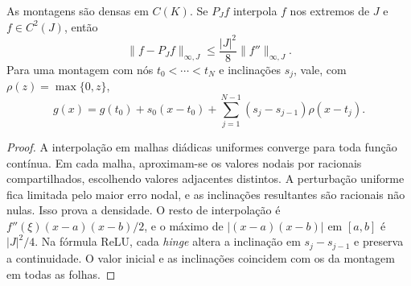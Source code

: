 \begin{proposition}\label{map:artigo_2:2.3}\label{artigo_2:prop:preliminary-facts}
As montagens são densas em $C(K)$. Se $P_Jf$ interpola $f$ nos extremos de $J$ e $f\in C^2(J)$, então
\begin{equation}
 \|f-P_Jf\|_{\infty,J}\le\frac{|J|^2}{8}\|f''\|_{\infty,J}.
 \label{artigo_2:eq:interpolation-remainder}
\end{equation}
Para uma montagem com nós $t_0<\cdots<t_N$ e inclinações $s_j$, vale, com $\rho(z)=\max\{0,z\}$,
\begin{equation}
 g(x)=g(t_0)+s_0(x-t_0)+\sum_{j=1}^{N-1}(s_j-s_{j-1})\rho(x-t_j).
 \label{artigo_2:eq:assembly-relu}
\end{equation}
\end{proposition}
\begin{proof}
A interpolação em malhas diádicas uniformes converge para toda função contínua. Em cada malha, aproximam-se os valores nodais por racionais compartilhados, escolhendo valores adjacentes distintos. A perturbação uniforme fica limitada pelo maior erro nodal, e as inclinações resultantes são racionais não nulas. Isso prova a densidade. O resto de interpolação é $f''(\xi)(x-a)(x-b)/2$, e o máximo de $|(x-a)(x-b)|$ em $[a,b]$ é $|J|^2/4$. Na fórmula ReLU, cada \emph{hinge} altera a inclinação em $s_j-s_{j-1}$ e preserva a continuidade. O valor inicial e as inclinações coincidem com os da montagem em todas as folhas.
\end{proof}

